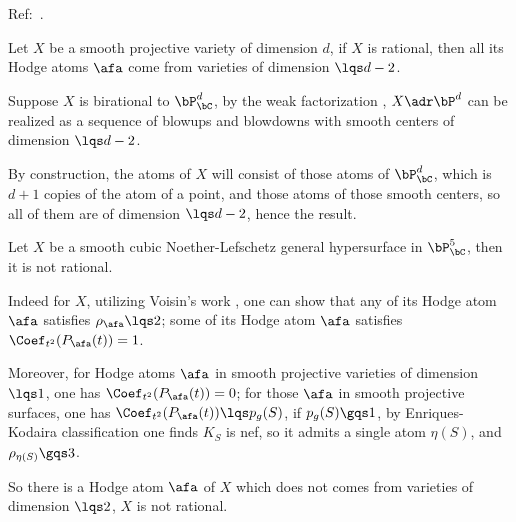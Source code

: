 \documentclass[article, a4paper, twoside]{universal}
\begin{document}
\confighead{}{}{}



Ref:~.


\begin{thm}
    Let $X$ be a smooth projective variety of dimension $d$, if $X$ is rational, then all its Hodge atoms $\afa$ come from varieties of dimension $\lqs d-2$.
\end{thm}

\begin{prf}
    Suppose $X$ is birational to $\bP_{\bC}^{d}$, by the weak factorization \cite[Theorem~0.1.1]{AKMW2002}, $X\adr\bP^{d}$ can be realized as a sequence of blowups and blowdowns with smooth centers of dimension $\lqs d-2$.

    By construction, the atoms of $X$ will consist of those atoms of $\bP_{\bC}^{d}$, which is $d+1$ copies of the atom of a point, and those atoms of those smooth centers, so all of them are of dimension $\lqs d-2$, hence the result.
\end{prf}


\begin{thm}
    Let $X$ be a smooth cubic Noether-Lefschetz general hypersurface in $\bP_{\bC}^{5}$, then it is not rational.
\end{thm}

\begin{prf}
    Indeed for $X$, utilizing Voisin's work \cite{Voisin1986}, one can show that any of its Hodge atom $\afa$ satisfies $\rho_{\afa}\lqs2$; some of its Hodge atom $\afa$ satisfies $\Coef_{t^{2}}(P_{\afa}(t))=1$.

    Moreover, for Hodge atoms $\afa$ in smooth projective varieties of dimension $\lqs1$, one has $\Coef_{t^{2}}(P_{\afa}(t))=0$; for those $\afa$ in smooth projective surfaces, one has $\Coef_{t^{2}}(P_{\afa}(t))\lqs p_{g}(S)$, if $p_{g}(S)\gqs1$, by Enriques-Kodaira classification one finds $K_{S}$ is nef, so it admits a single atom $\eta(S)$, and $\rho_{\eta(S)}\gqs3$.

    So there is a Hodge atom $\afa$ of $X$ which does not comes from varieties of dimension $\lqs2$, $X$ is not rational.
\end{prf}


\printref
\end{document}

